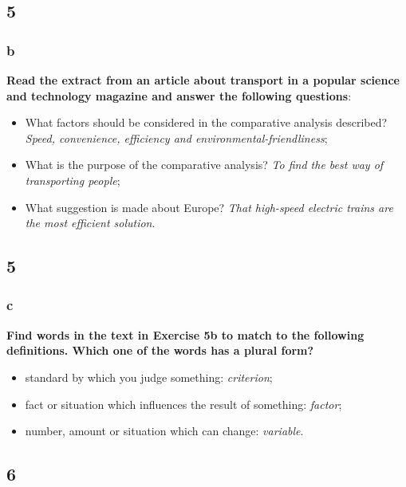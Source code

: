 \subsection{5}

\subsubsection{b}

\textbf{Read the extract from an article about transport in a popular science and technology magazine and answer the following questions}:

\begin{itemize}

\item What factors should be considered in the comparative analysis described? \textit{Speed, convenience, efficiency and environmental-friendliness};
\item What is the purpose of the comparative analysis? \textit{To find the best way of transporting people};
\item What suggestion is made about Europe? \textit{That high-speed electric trains are the most efficient solution}.

\end{itemize}

\subsection{5}

\subsubsection{c}

\textbf{Find words in the text in Exercise 5b to match to the following definitions. Which one of the words has a plural form?}

\begin{itemize}

\item standard by which you judge something: \textit{criterion};
\item fact or situation which influences the result of something: \textit{factor};
\item number, amount or situation which can change: \textit{variable}.

\end{itemize}

\subsection{6}


